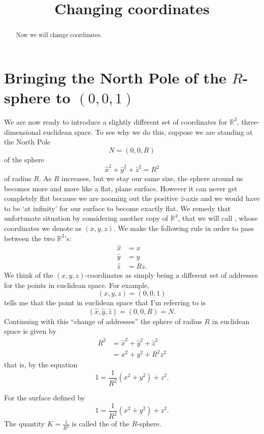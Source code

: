 \documentclass{ximera}
\title{Changing coordinates}
\begin{document}
\begin{abstract}
Now we will change coordinates.
\end{abstract}
\maketitle


\section{Bringing the North Pole of the $R$-sphere to $\left(
0,0,1\right)  $}

We are now ready to introduce a slightly different set of coordinates for
$\mathbb{R}^{3}$, three-dimensional euclidean space. To see why we do this,
suppose we are standing at the North Pole%
\[
N=\left(0,0,R\right)
\]
of the sphere%
\[
\hat{x}^{2}+\hat{y}^{2}+\hat{z}^{2}=R^{2} %
\]
of radius $R$. As $R$ increases, but we stay our same size, the sphere
around us becomes more and more like a flat, plane surface. However it
can never get completely flat because we are zooming out the positive
$\hat{z}$-axis and we would have to be `at infinity' for our surface
to become exactly flat. We remedy that unfortunate situation by
considering another copy of $\mathbb{R}^{3}$, that we will call
, whose coordinates we denote as
$\left( x,y,z\right) $.  We make the following rule in order to pass
between the two $\mathbb{R}^{3}$'s:%
\begin{align*}
\hat{x}  &  =x\\
\hat{y}  &  =y\\
\hat{z}  &  =Rz.
\end{align*}
We think of the $\left( x,y,z\right) $-coordinates as simply being a
different set of addresses for the points in euclidean space. For
example,
\[
\left(x,y,z\right)  =\left(0,0,1\right)
\]
tells me that the point in euclidean space that I'm referring to is%
\[
\left(\hat{x},\hat{y},\hat{z}\right) =\left( 0,0,R\right)= N.
\]
Continuing with this ``change of addresses'' the sphere of radius $R$
in euclidean space is given by
\begin{align*}
R^{2} & =\hat{x}^{2}+\hat{y}^{2}+\hat{z}^{2}\\ &
=x^{2}+y^{2}+R^{2}z^{2}
\end{align*}
that is, by the equation
\[
1=\frac{1}{R^{2}}\left(  x^{2}+y^{2}\right)  +z^{2}. %
\]
\begin{definition}
  For the surface defined by
  \[
  1=\frac{1}{R^{2}}\left(  x^{2}+y^{2}\right)  +z^{2}. %
  \]
The quantity $K=\frac{1}{R^{2}}$ is called the  of the
$R$-sphere.
\end{definition}
\end{document}
